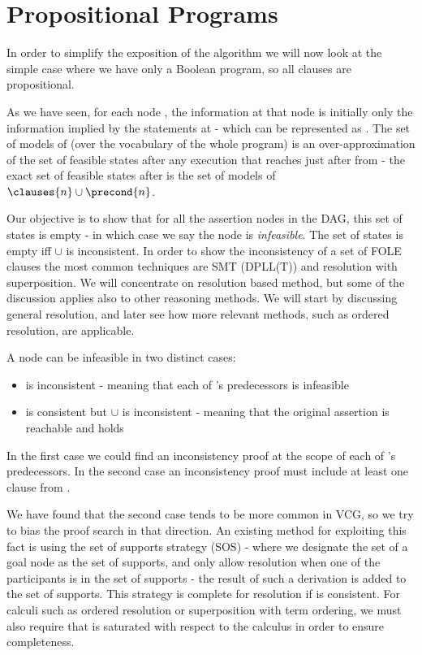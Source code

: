 \chapter{Propositional Programs}
In order to simplify the exposition of the algorithm we will now look at the simple case where we have only a Boolean program, so all clauses are propositional.

As we have seen, for each node , the information at that node is initially only the information implied by the statements at  - which can be represented as .
The set of models of  (over the vocabulary of the whole program) is an over-approximation of the set of feasible states after any execution that reaches just after  from  - 
the exact set of feasible states after  is the set of models of $\clauses{n}\cup\precond{n}$.

Our objective is to show that for all the assertion nodes in the DAG, this set of states is empty - in which case we say the node is \emph{infeasible}.
The set of states is empty iff $\cup$ is inconsistent.
In order to show the inconsistency of a set of FOLE clauses the most common techniques are SMT (DPLL(T)) and resolution with superposition.
We will concentrate on resolution based method, but some of the discussion applies also to other reasoning methods.
We will start by discussing general resolution, and later see how more relevant methods, such as ordered resolution, are applicable.

A node  can be infeasible in two distinct cases:
\begin{itemize}
	\item {} is inconsistent - meaning that each of 's predecessors is infeasible
	\item {} is consistent but $\cup$ is inconsistent - meaning that the original assertion is reachable and holds
\end{itemize}

In the first case we could find an inconsistency proof at the scope of each of 's predecessors.
In the second case an inconsistency proof must include at least one clause from .

We have found that the second case tends to be more common in VCG, so we try to bias the proof search in that direction.
An existing method for exploiting this fact is using the set of supports strategy (SOS) - where we designate the set  of a goal node  as the set of supports, and only allow resolution when one of the participants is in the set of supports - the result of such a derivation is added to the set of supports. 
This strategy is complete for resolution if  is consistent. 
For calculi such as ordered resolution or superposition with term ordering, we must also require that  is saturated with respect to the calculus in order to ensure completeness.

